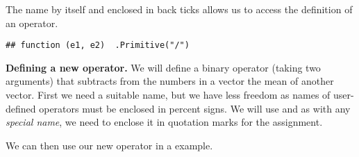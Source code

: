\documentclass[krantz2]{krantz}\usepackage{knitr}
\begin{document}
The name by itself and enclosed in back ticks allows us to access the definition of an operator.

\begin{knitrout}\footnotesize
{}\color{fgcolor}\begin{kframe}
\begin{alltt}
\end{alltt}
\begin{verbatim}
## function (e1, e2)  .Primitive("/")
\end{verbatim}
\end{kframe}
\end{knitrout}

\begin{explainbox}
\textbf{Defining a new operator.} We will define a binary operator (taking two arguments) that subtracts from the numbers in a vector the mean of another vector. First we need a suitable name, but we have less freedom as names of user-defined operators must be enclosed in percent signs. We will use  and as with any \emph{special name}, we need to enclose it in quotation marks for the assignment.

\begin{knitrout}\footnotesize
{}\color{fgcolor}
\end{knitrout}

We can then use our new operator in a example.

\begin{knitrout}\footnotesize
{}\color{fgcolor}
\end{knitrout}


\end{explainbox}
\end{document}
